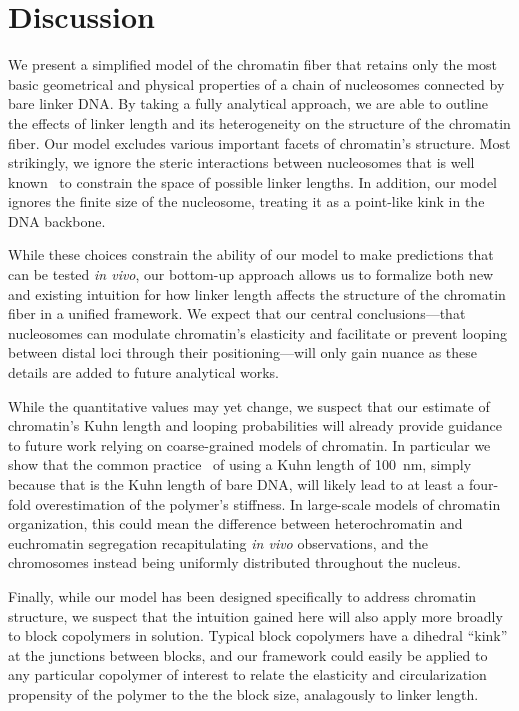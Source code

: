 \documentclass[%
 reprint,
superscriptaddress,
showpacs,preprintnumbers,
 amsmath,amssymb,
 aps,
 prl,
]{revtex4-1}
\begin{document}
\section{Discussion}

We present a simplified model of the chromatin fiber that retains only the most
    basic geometrical and physical properties of a chain of nucleosomes
    connected by bare linker DNA.\@
By taking a fully analytical approach, we are able to outline the effects of
    linker length and its heterogeneity on the structure of the chromatin fiber.
Our model excludes various important facets of chromatin's structure.
Most strikingly, we ignore the steric interactions between nucleosomes that is
    well known~\cite{widom1992} to constrain the space of possible linker
    lengths.
In addition, our model ignores the finite size of the nucleosome, treating it as
    a point-like kink in the DNA backbone.

While these choices constrain the ability of our model to make predictions that
    can be tested \textit{in vivo}, our bottom-up approach allows us to
    formalize both new and existing intuition for how linker length affects the
    structure of the chromatin fiber in a unified framework.
We expect that our central conclusions---that nucleosomes can modulate
    chromatin's elasticity and facilitate or prevent looping between distal loci
    through their positioning---will only gain nuance as these details are added
    to future analytical works.

While the quantitative values may yet change, we suspect that our estimate of
    chromatin's Kuhn length and looping probabilities will already provide
    guidance to future work relying on coarse-grained models of chromatin.
In particular we show that the common practice~\cite{macphersonInPress,nuebler2018}
    of using a Kuhn length of \SI{100}{\nano\metre}, simply because that is the
    Kuhn length of bare DNA, will likely lead to at least a four-fold
    overestimation of the polymer's stiffness.
In large-scale models of chromatin organization, this could mean the difference
    between heterochromatin and euchromatin segregation recapitulating
    \textit{in vivo} observations, and the chromosomes instead being uniformly
    distributed throughout the nucleus.

Finally, while our model has been designed specifically to address chromatin
    structure, we suspect that the intuition gained here will also apply more
    broadly to block copolymers in solution.
Typical block copolymers have a dihedral ``kink'' at the junctions between
    blocks, and our framework could easily be applied to any particular
    copolymer of interest to relate the elasticity and circularization
    propensity of the polymer to the the block size, analagously to linker
    length.
\end{document}
